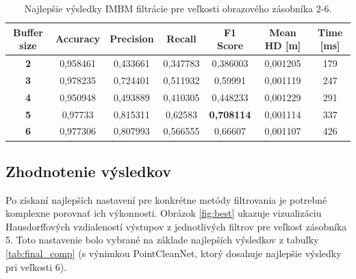 \begin{table}[h]
	\caption{\label{tab:imbm_best} Najlepšie výsledky IMBM filtrácie pre veľkosti obrazového zásobníka 2-6. }
	\centering
	\begin{tabular}{ccccccc}
		\toprule
		\textbf{Buffer size} & \textbf{Accuracy} & \textbf{Precision} & \textbf{Recall} & \textbf{F1 Score} & \textbf{Mean HD [m]} & \textbf{Time [ms]} \\ 
		\midrule
		\textbf{2}           & 0,958461          & 0,433661           & 0,347783        & 0,386003          & 0,001205          & 179           \\ 
		\textbf{3}           & 0,978235          & 0,724401           & 0,511932        & 0,59991           & 0,001119          & 247           \\ 
		\textbf{4}           & 0,950948          & 0,493889           & 0,410305        & 0,448233          & 0,001229          & 291           \\ 
		\textbf{5}           & 0,97733           & 0,815311           & 0,62583         & \textbf{0,708114}          & 0,001114 & 337           \\ 
		\textbf{6}           & 0,977306          & 0,807993           & 0,566555        & 0,66607           & 0,001107          & 426           \\ 
		\bottomrule
	\end{tabular}
\end{table}

\subsection{Zhodnotenie výsledkov}

Po získaní najlepších nastavení pre konkrétne metódy filtrovania je potrebné komplexne porovnať ich výkonnosti. Obrázok \ref{fig:best} ukazuje vizualizáciu Hausdorffových vzdialeností výstupov z jednotlivých filtrov pre veľkosť zásobníka 5. Toto nastavenie bolo vybrané na základe najlepších výsledkov z tabuľky \ref {tab:final_comp} (s výnimkou PointCleanNet, ktorý dosahuje najlepšie výsledky pri veľkosti 6).

